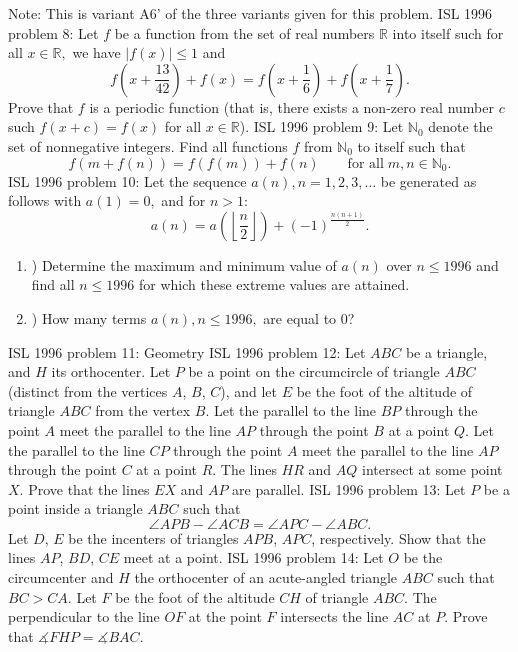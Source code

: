 Note: This is variant A6' of the three variants given for this problem. 
ISL 1996 problem 8:  Let $ f$ be a function from the set of real numbers $ \mathbb{R}$ into itself such for all $ x \in \mathbb{R},$ we have $ |f(x)| \leq 1$ and
\[
f \left( x + \frac{13}{42} \right) + f(x) = f \left( x + \frac{1}{6} \right) + f \left( x + \frac{1}{7} \right).
\]
Prove that $ f$ is a periodic function (that is, there exists a non-zero real number $ c$ such $ f(x+c) = f(x)$ for all $ x \in \mathbb{R}$). 
ISL 1996 problem 9:  Let $ \mathbb{N}_0$ denote the set of nonnegative integers. Find all  functions $ f$ from $ \mathbb{N}_0$ to itself such that
\[ f(m + f(n)) = f(f(m)) + f(n)\qquad \text{for all} \; m, n \in \mathbb{N}_0. \] 
ISL 1996 problem 10:  Let the sequence $ a(n), n = 1,2,3, \ldots$ be generated as follows with $ a(1) = 0,$ and for $ n > 1:$
\[ a(n) = a\left( \left \lfloor \frac{n}{2} \right \rfloor \right) + (-1)^{\frac{n(n+1)}{2}}. \]
\begin{enumerate}
  \item ) Determine the maximum and minimum value of $ a(n)$ over $ n \leq 1996$ and find all $ n \leq 1996$ for which these extreme values are attained.
  \item ) How many terms $ a(n), n \leq 1996,$ are equal to 0?
\end{enumerate} 
ISL 1996 problem 11:  Geometry 
ISL 1996 problem 12:  Let $ ABC$ be a triangle, and $ H$ its orthocenter. Let $ P$ be a point on the circumcircle of triangle $ ABC$ (distinct from the vertices $ A$, $ B$, $ C$), and let $ E$ be the foot of the altitude of triangle $ ABC$ from the vertex $ B$. Let the parallel to the line $ BP$ through the point $ A$ meet the parallel to the line $ AP$ through the point $ B$ at a point $ Q$. Let the parallel to the line $ CP$ through the point $ A$ meet the parallel to the line $ AP$ through the point $ C$ at a point $ R$. The lines $ HR$ and $ AQ$ intersect at some point $ X$. Prove that the lines $ EX$ and $ AP$ are parallel. 
ISL 1996 problem 13:  Let $ P$ be a point inside a triangle $ ABC$ such that
\[ \angle APB - \angle ACB = \angle APC - \angle ABC. \]
Let $ D$, $ E$ be the incenters of triangles $ APB$, $ APC$, respectively. Show that the lines $ AP$, $ BD$, $ CE$ meet at a point. 
ISL 1996 problem 14:  Let $O$ be the circumcenter and $H$ the orthocenter of an acute-angled triangle $ABC$ such that $BC>CA$. Let $F$ be the foot of the altitude $CH$ of triangle $ABC$. The perpendicular to the line $OF$ at the point $F$ intersects the line $AC$ at $P$. Prove that $\measuredangle FHP=\measuredangle BAC$. 

